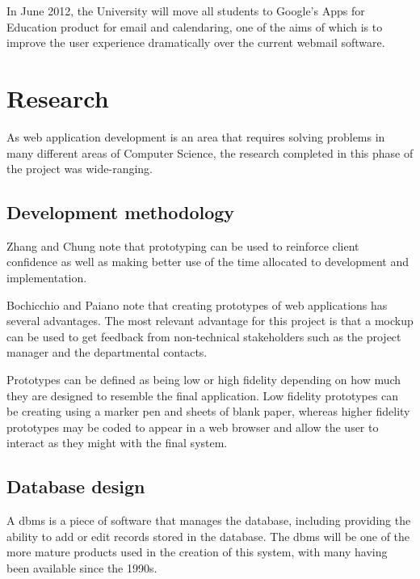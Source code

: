 \documentclass[]{scrartcl}
\begin{document}
In June 2012, the University will move all students to Google's Apps for
Education product for email and calendaring, one of the aims of which is to
improve the user experience dramatically over the current webmail software.

\section{Research}


As web application development is an area that requires solving problems in
many different areas of Computer Science, the research completed in this phase
of the project was wide-ranging.

\subsection{Development methodology}


Zhang and Chung \cite{MODFM_2003} note that prototyping can be used to
reinforce client confidence as well as making better use of the time allocated
to development and implementation.

Bochicchio and Paiano \cite{PrototypingWebApplications_2000} note that
creating prototypes of web applications has several advantages.
The most relevant advantage for this project is that a mockup can be used to
get feedback from non-technical stakeholders such as the project manager and
the departmental contacts.

Prototypes can be defined as being low or high fidelity depending on how much
they are designed to resemble the final application. Low fidelity prototypes
can be creating using a marker pen and sheets of blank paper, whereas higher
fidelity prototypes may be coded to appear in a web browser and allow the user
to interact as they might with the final system.

\subsection{Database design}

A \gls{dbms} is a piece of software that manages the
database, including providing the ability to add or edit records stored in the
database. The \gls{dbms} will be one of the more mature products used in the
creation of this system, with many having been available since the 1990s.
\end{document}
